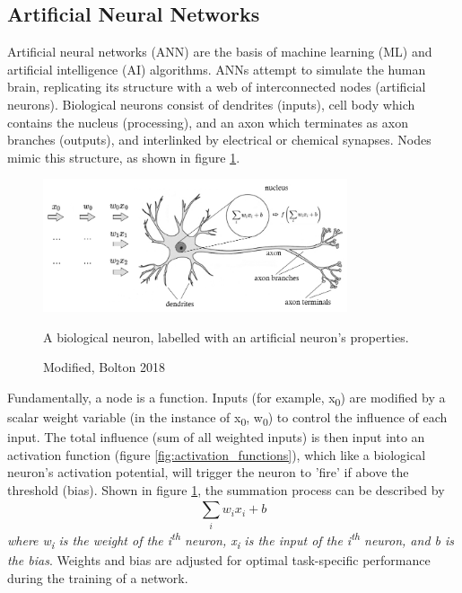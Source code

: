 \documentclass[12pt, a4paper]{article}
\begin{document}
\subsection{Artificial Neural Networks}
Artificial neural networks (ANN) are the basis of machine learning (ML) and artificial intelligence (AI) algorithms. ANNs attempt to simulate the human brain, replicating its structure with a web of interconnected nodes (artificial neurons). Biological neurons consist of dendrites (inputs), cell body which contains the nucleus (processing), and an axon which terminates as axon branches (outputs), and interlinked by electrical or chemical synapses. Nodes mimic this structure, as shown in figure \ref{fig:neuron}.
\begin{figure}[h]
    \centering
    \includegraphics[width=0.8\textwidth]{neuron}
    \caption{A biological neuron, labelled with an artificial neuron's properties.}
    \caption*{Modified, Bolton 2018}
    \label{fig:neuron}
\end{figure}
Fundamentally, a node is a function. Inputs (for example, x\textsubscript{0}) are modified by a scalar weight variable (in the instance of x\textsubscript{0}, w\textsubscript{0}) to control the influence of each input. The total influence (sum of all weighted inputs) is then input into an activation function (figure \ref{fig:activation_functions}), which like a biological neuron's activation potential, will trigger the neuron to 'fire' if above the threshold (bias). Shown in figure \ref{fig:neuron}, the summation process can be described by
\begin{equation}
     \sum_{i}^{}w_ix_i+b
\end{equation}
\emph{where w\textsubscript{i} is the weight of the i\textsuperscript{th} neuron, x\textsubscript{i} is the input of the i\textsuperscript{th} neuron, and b is the bias}. Weights and bias are adjusted for optimal task-specific performance during the training of a network.
\end{document}
